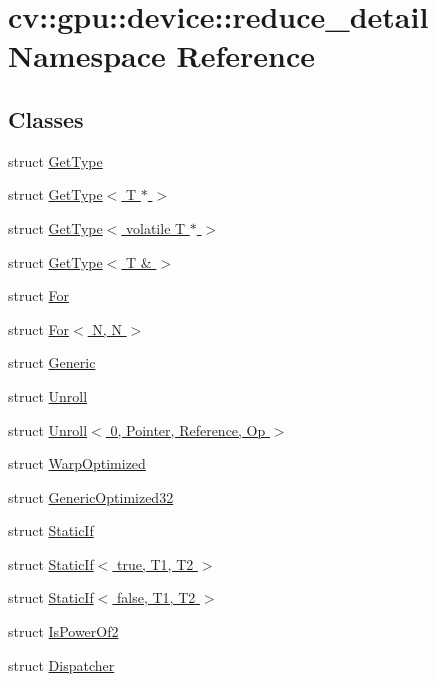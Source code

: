 \hypertarget{namespacecv_1_1gpu_1_1device_1_1reduce__detail}{\section{cv\-:\-:gpu\-:\-:device\-:\-:reduce\-\_\-detail Namespace Reference}
\label{namespacecv_1_1gpu_1_1device_1_1reduce__detail}
}
\subsection*{Classes}
\begin{DoxyCompactItemize}
\item 
struct \hyperlink{structcv_1_1gpu_1_1device_1_1reduce__detail_1_1GetType}{Get\-Type}
\item 
struct \hyperlink{structcv_1_1gpu_1_1device_1_1reduce__detail_1_1GetType_3_01T_01_5_01_4}{Get\-Type$<$ T $\ast$ $>$}
\item 
struct \hyperlink{structcv_1_1gpu_1_1device_1_1reduce__detail_1_1GetType_3_01volatile_01T_01_5_01_4}{Get\-Type$<$ volatile T $\ast$ $>$}
\item 
struct \hyperlink{structcv_1_1gpu_1_1device_1_1reduce__detail_1_1GetType_3_01T_01_6_01_4}{Get\-Type$<$ T \& $>$}
\item 
struct \hyperlink{structcv_1_1gpu_1_1device_1_1reduce__detail_1_1For}{For}
\item 
struct \hyperlink{structcv_1_1gpu_1_1device_1_1reduce__detail_1_1For_3_01N_00_01N_01_4}{For$<$ N, N $>$}
\item 
struct \hyperlink{structcv_1_1gpu_1_1device_1_1reduce__detail_1_1Generic}{Generic}
\item 
struct \hyperlink{structcv_1_1gpu_1_1device_1_1reduce__detail_1_1Unroll}{Unroll}
\item 
struct \hyperlink{structcv_1_1gpu_1_1device_1_1reduce__detail_1_1Unroll_3_010_00_01Pointer_00_01Reference_00_01Op_01_4}{Unroll$<$ 0, Pointer, Reference, Op $>$}
\item 
struct \hyperlink{structcv_1_1gpu_1_1device_1_1reduce__detail_1_1WarpOptimized}{Warp\-Optimized}
\item 
struct \hyperlink{structcv_1_1gpu_1_1device_1_1reduce__detail_1_1GenericOptimized32}{Generic\-Optimized32}
\item 
struct \hyperlink{structcv_1_1gpu_1_1device_1_1reduce__detail_1_1StaticIf}{Static\-If}
\item 
struct \hyperlink{structcv_1_1gpu_1_1device_1_1reduce__detail_1_1StaticIf_3_01true_00_01T1_00_01T2_01_4}{Static\-If$<$ true, T1, T2 $>$}
\item 
struct \hyperlink{structcv_1_1gpu_1_1device_1_1reduce__detail_1_1StaticIf_3_01false_00_01T1_00_01T2_01_4}{Static\-If$<$ false, T1, T2 $>$}
\item 
struct \hyperlink{structcv_1_1gpu_1_1device_1_1reduce__detail_1_1IsPowerOf2}{Is\-Power\-Of2}
\item 
struct \hyperlink{structcv_1_1gpu_1_1device_1_1reduce__detail_1_1Dispatcher}{Dispatcher}
\end{DoxyCompactItemize}
